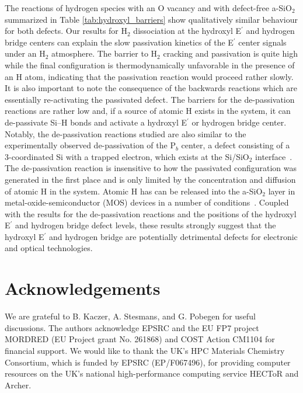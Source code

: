 \documentclass[aps,prb,reprint,superscriptaddress,showpacs]{revtex4-1}
\begin{document}
The reactions of hydrogen species with an O vacancy and with defect-free a-SiO$_2$ summarized in Table \ref{tab:hydroxyl_barriers} show qualitatively similar behaviour for both defects. Our results for H$_2$ dissociation at the hydroxyl E$^\prime$ and hydrogen bridge centers can explain the slow passivation kinetics of the E$^\prime$ center signals under an H$_2$ atmosphere. The barrier to H$_2$ cracking and passivation is quite high while the final configuration is thermodynamically unfavorable in the presence of an H atom, indicating that the passivation reaction would proceed rather slowly. It is also important to note the consequence of the backwards reactions which are essentially re-activating the passivated defect. The barriers for the de-passivation reactions are rather low and, if a source of atomic H exists in the system, it can de-passivate \mbox{Si--H} bonds and activate a hydroxyl E$^\prime$ or hydrogen bridge center. Notably, the de-passivation reactions studied are also similar to the experimentally observed de-passivation of the P$_b$ center, a defect consisting of a 3-coordinated Si with a trapped electron, which exists at the Si/SiO$_2$ interface~\cite{cartier_depassivation}. The de-passivation reaction is insensitive to how the passivated configuration was generated in the first place and is only limited by the concentration and diffusion of atomic H in the system. Atomic H has can be released into the a-SiO$_2$ layer in metal-oxide-semiconductor (MOS) devices in a number of conditions~\cite{h_gate1,h_gate2,poindexter_hydrogenous}. Coupled with the results for the de-passivation reactions and the positions of the hydroxyl E$^\prime$ and hydrogen bridge defect levels, these results strongly suggest that the hydroxyl E$^\prime$ and hydrogen bridge are potentially detrimental defects for electronic and optical technologies.

\section{Acknowledgements}
We are grateful to B. Kaczer, A. Stesmans, and G. Pobegen for useful discussions. The authors acknowledge EPSRC and the EU FP7 project MORDRED (EU Project grant No. 261868) and COST Action CM1104 for financial support. We would like to thank the UK's HPC Materials Chemistry Consortium, which is funded by EPSRC (EP/F067496), for providing computer resources on the UK's national high-performance computing service HECToR and Archer. 


\end{document}

